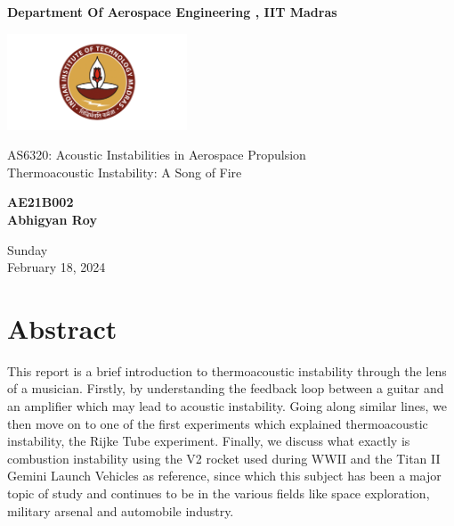 \documentclass[8pt]{article} %
\begin{document}
\begin{titlepage}
    \begin{center}
        
        \vspace*{1cm}
            
        \Huge
        \textbf{Department Of Aerospace Engineering , IIT Madras}
	
        \vspace{0.5cm}

	\includegraphics[width=0.4\textwidth]{IITM_logo.png}

        \LARGE
        AS6320: Acoustic Instabilities in Aerospace Propulsion \\
	\vspace{2cm}
	Thermoacoustic Instability: A Song of Fire
            
        \vspace{1.5cm}
            
        \textbf{AE21B002\\Abhigyan Roy\\}
            
        \vfill
           
        \vspace{0.8cm}
            
        \Large
        Sunday\\
        February 18, 2024\\
            
    \end{center}
\end{titlepage}

\newpage
\tableofcontents
\vspace{2cm}
\listoffigures


\newpage

\section{Abstract}
This report is a brief introduction to thermoacoustic instability through the lens of a musician. Firstly, by understanding the feedback loop between a guitar and an amplifier which may lead to acoustic instability. Going along similar lines, we then move on to one of the first experiments which explained thermoacoustic instability, the Rijke Tube experiment. Finally, we discuss what exactly is combustion instability using the V2 rocket used during WWII and the Titan II Gemini Launch Vehicles as reference, since which this subject has been a major topic of study and continues to be in the various fields like space exploration, military arsenal and automobile industry.
\end{document}
